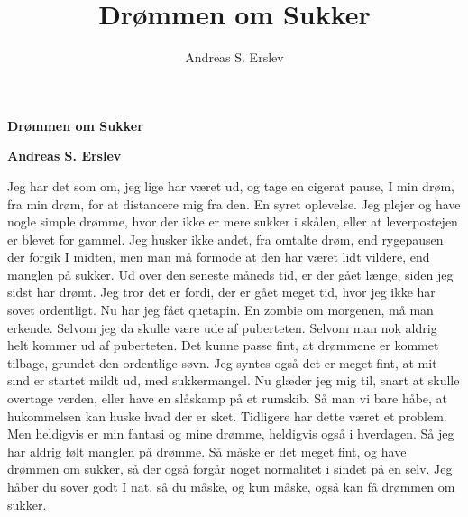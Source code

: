 \documentclass[]{article}
\title{Drømmen om Sukker}
\author{Andreas S. Erslev}
\begin{document}
	
	\begin{center}
		\Large\textbf{Drømmen om Sukker}
	\end{center}
	
	\begin{center}
		\large\textbf{Andreas S. Erslev}
	\end{center}
	
	Jeg har det som om, jeg lige har været ud, og tage en cigerat pause, I min drøm, fra min drøm, for at distancere mig fra den.
	\newline
	\newline
	En syret oplevelse.
	\newline
	\newline
	Jeg plejer og have nogle simple drømme, hvor der ikke er mere sukker i skålen, eller at leverpostejen er blevet for gammel.
	\newline
	\newline
	Jeg husker ikke andet, fra omtalte drøm, end rygepausen der forgik I midten, men man må formode at den har været lidt vildere, end manglen på sukker.
	\newline
	\newline
	Ud over den seneste måneds tid, er der gået længe, siden jeg sidst har drømt. Jeg tror det er fordi, der er gået meget tid, hvor jeg ikke har sovet ordentligt.
	\newline
	\newline
	Nu har jeg fået quetapin.
	\newline
	\newline
	En zombie om morgenen, må man erkende. Selvom jeg da skulle være ude af puberteten. Selvom man nok aldrig helt kommer ud af puberteten.
	\newline
	\newline
	Det kunne passe fint, at drømmene er kommet tilbage, grundet den ordentlige søvn.
	\newline
	Jeg syntes også det er meget fint, at mit sind er startet mildt ud, med sukkermangel.
	\newline
	\newline
	Nu glæder jeg mig til, snart at skulle overtage verden, eller have en slåskamp på et rumskib.
	\newline
	\newline
	Så man vi bare håbe, at hukommelsen kan huske hvad der er sket.
	\newline
	\newline
	Tidligere har dette været et problem. Men heldigvis er min fantasi og mine drømme, heldigvis også i hverdagen.
	\newline
	\newline
	Så jeg har aldrig følt manglen på drømme.
	\newline
	\newline
	Så måske er det meget fint, og have drømmen om sukker, så der også forgår noget normalitet i sindet på en selv.
	\newline
	\newline
	Jeg håber du sover godt I nat, så du måske, og kun måske, også kan få drømmen om sukker.
	
\end{document}
